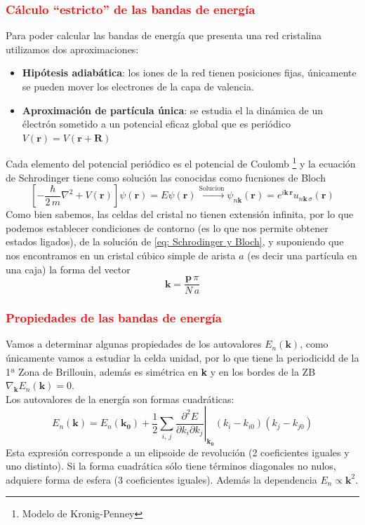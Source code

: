 \subsubsection{\textcolor{red}{Cálculo ``estricto'' de las bandas de energía}} \label{sec: Calculo de bandas}
Para poder calcular las bandas de energía que presenta una red cristalina utilizamos dos aproximaciones:
\begin{itemize}
	\item \textbf{Hipótesis adiabática}: los iones de la red tienen posiciones fijas, únicamente se pueden mover los electrones de la capa de valencia.
	\item \textbf{Aproximación de partícula única}: se estudia el la dinámica de un électrón sometido a un potencial eficaz global que es periódico $V(\mathbf{r})=V(\mathbf{r+R})$
\end{itemize}
Cada elemento del potencial periódico es el potencial de Coulomb \footnote{Modelo de Kronig-Penney} y la ecuación de Schrodinger tiene como solución las conocidas como fucniones de Bloch
\begin{equation}
	\left[-\frac{\hbar}{2\,m} \nabla^2+V(\mathbf{r})\right]\psi(\mathbf{r})=E\psi(\mathbf{r}) \xrightarrow{\mathrm{Solucion}} \psi_{n\mathbf{k}}(\mathbf{r})=e^{i\mathbf{k \, r}}u_{n \mathbf{k} \,\sigma}(\mathbf{r})
	\label{eq: Schrodinger y Bloch}
\end{equation}
Como bien sabemos, las celdas del cristal no tienen extensión infinita, por lo que podemos establecer condiciones de contorno (es lo que nos permite obtener estados ligados), de la solución de \ref{eq: Schrodinger y Bloch}, y suponiendo que nos encontramos en un cristal cúbico simple de arista $a$ (es decir una partícula en una caja) la forma del vector $$\mathbf{k}=\frac{\mathbf{p}\, \pi}{N\, a}$$
\subsubsection{\textcolor{red}{Propiedades de las bandas de energía}}

Vamos a determinar algunas propiedades de los autovalores $E_n(\mathbf{k})$, como únicamente vamos a estudiar la celda unidad, por lo que tiene la periodicidd de la 1ª Zona de Brillouin, además es simétrica en \textbf{k} y en los bordes de la ZB $\nabla_\mathbf{k} E_n(\mathbf{k})=0$.\\

Los autovalores de la energía son formas cuadráticas:
\begin{equation}
	E_n(\mathbf{k})=	E_n(\mathbf{k_0})+\frac{1}{2}\left. \sum_{i, \ j} \frac{\partial ^2 E}{\partial k_i \partial k_j}\right |_\mathbf{k_0} (k_i-k_{i0})(k_j-k_{j0})
 \label{eq: Forma bandas}
\end{equation}
Esta expresión corresponde a un elipsoide de revolución (2 coeficientes iguales y uno distinto). Si la forma cuadrática sólo tiene términos diagonales no nulos, adquiere forma de esfera (3 coeficientes iguales). Además la dependencia $E_n \propto \mathbf{k}^2$.
